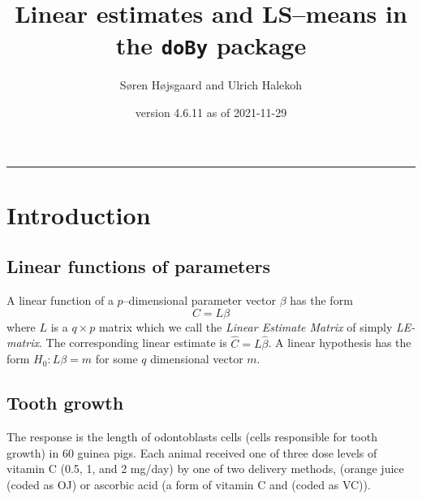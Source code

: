 \documentclass[11pt]{article}\usepackage[]{graphicx}\usepackage[]{color}
\title{Linear estimates and LS--means in the \texttt{doBy} package}
\author{S{\o}ren H{\o}jsgaard and Ulrich Halekoh}
\date{\pkg{doBy} version 4.6.11 as of 2021-11-29}
\def\comi#1{{\it #1}}
\begin{document}




\maketitle
\hrule
\tableofcontents

\parindent0pt
\parskip5pt








\section{Introduction}
\label{sec:introduction}

\subsection{Linear functions of parameters}
\label{sec:line-funct-param}

A linear function of a $p$--dimensional parameter vector $\beta$ has
the form
\begin{displaymath}
  C=L\beta
\end{displaymath}
where $L$ is a $q\times p$ matrix which we call the \comi{Linear
  Estimate Matrix} of simply \comi{LE-matrix}.  The corresponding
linear estimate is $\hat C = L \hat \beta$.  A linear hypothesis has
the form $H_0: L\beta=m$ for some $q$ dimensional vector $m$.

\subsection{Tooth growth}
\label{sec:tooth-growth}

The response is the length of odontoblasts cells (cells responsible for
tooth growth) in 60 guinea pigs.  Each animal received one of
three dose levels of vitamin C (0.5, 1, and 2 mg/day) by one of
two delivery methods, (orange juice (coded as OJ) or ascorbic acid 
(a form of vitamin C and (coded as VC)).
\end{document}
